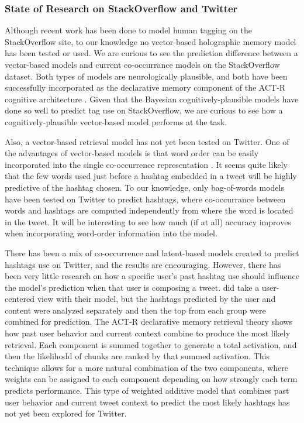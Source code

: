 \documentclass[man,floatsintext]{apa6}
\begin{document}
\subsubsection{State of Research on StackOverflow and Twitter}

Although recent work has been done to model human tagging on the StackOverflow site, to our knowledge no vector-based holographic memory model has been tested or used.
We are curious to see the prediction difference between a vector-based models and current co-occurrance models on the StackOverflow dataset.
Both types of models are neurologically plausible, and both have been successfully incorporated as the declarative memory component of the ACT-R cognitive architecture \parencite{Rutledge2007}. 
Given that the Bayesian cognitively-plausible models have done so well to predict tag use on StackOverflow, we are curious to see how a cognitively-plausible vector-based model performs at the task.

Also, a vector-based retrieval model has not yet been tested on Twitter.
One of the advantages of vector-based models is that word order can be easily incorporated into the single co-occurrence representation \parencite{Jones2007}.
It seems quite likely that the few words used just before a hashtag embedded in a tweet will be highly predictive of the hashtag chosen.
To our knowledge, only bag-of-words models have been tested on Twitter to predict hashtags, where co-occurrance between words and hashtags are computed independently from where the word is located in the tweet.
It will be interesting to see how much (if at all) accuracy improves when incorporating word-order information into the model.

There has been a mix of co-occurrence and latent-based models created to predict hashtags use on Twitter, and the results are encouraging.
However, there has been very little research on how a specific user's past hashtag use should influence the model's prediction when that user is composing a tweet.
\textcite{Kywe2012} did take a user-centered view with their model, but the hashtags predicted by the user and content were analyzed separately and then the top from each group were combined for prediction.
The ACT-R declarative memory retrieval theory shows how past user behavior and current context combine to produce the most likely retrieval.
Each component is summed together to generate a total activation, and then the likelihodd of chunks are ranked by that summed activation.
This technique allows for a more natural combination of the two components, where weights can be assigned to each component depending on how strongly each term predicts performance.
This type of weighted additive model that combines past user behavior and current tweet context to predict the most likely hashtags has not yet been explored for Twitter.
\end{document}
